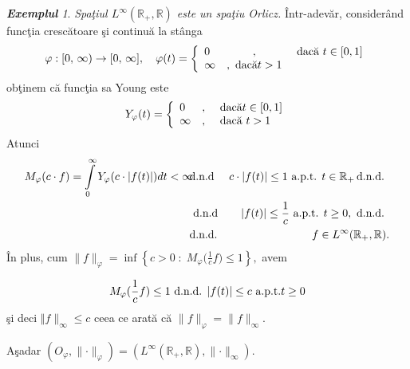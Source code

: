 \documentclass[ a4paper, 12pt]{report}
\theoremstyle{definition}
\theoremstyle{remark}
\newtheorem{exemple}{\bf Exemplul}[section]
\numberwithin{equation}{section}
\begin{document}
\begin{exemple} {\it Spa\c tiul $L^\infty(\mathbb{R}_+, \mathbb{R})$ este un spa\c tiu Orlicz.} \^ Intr-adev\u ar, consider\^ and func\c tia cresc\u atoare \c si continu\u a la st\^ anga
$$\varphi : [0,\, \infty) \rightarrow [0, \, \infty], \quad \varphi(t) = \left\{ \begin{array}{lcl} 0 &,& \hbox { dac\u a } t \in [0,1]\\
\infty &, \hbox{ dac\u a} t>1 \end{array}\right. $$
ob\c tinem c\u a func\c tia sa Young este
$$Y_\varphi(t) = \left\{ \begin{array}{lcl} 0 &,& \hbox{ dac\u a} t \in [0,1]\\
\infty &,& \hbox{ dac\u a } t>1 \end{array} \right. $$
Atunci
\begin{eqnarray*}
M_\varphi(c \cdot f) = \int\limits_{0}^{\infty} Y_\varphi(c \cdot \lvert f(t) \rvert) dt < \infty \!\!&\hbox{d.n.d}& \!\! c \cdot \lvert f(t) \rvert \leq 1 \hbox{ a.p.t. } t \in \mathbb{R}_+ \! \hbox{ d.n.d. }\\
&\hbox{ d.n.d }& \lvert f(t) \rvert \leq \frac{1}{c} \hbox{ a.p.t. } t \geq 0, \hbox{ d.n.d. } \\
&\hbox{d.n.d.}& f \in L^{\infty}(\mathbb{R}_+,\mathbb{R}).
\end{eqnarray*}
\^ In plus, cum $\lVert f \rVert_\varphi = \inf\left\{ c > 0 \; :\; M_\varphi\Big( \frac{1}{c}f \Big) \leq 1\right\},$ avem

$$M_\varphi(\frac{1}{c}f) \leq 1 \hbox{ d.n.d. } \lvert f(t) \rvert \leq c \hbox{ a.p.t.} t \geq 0 $$
\c si deci $\Vert f \rVert_{\infty} \leq c$ ceea ce arat\u a  c\u  a $\lVert f\rVert_\varphi = \lVert f \rVert_{\infty}$.

A\c sadar $ (O_\varphi, \lVert \cdot \rVert_\varphi) = (L^\infty(\mathbb{R}_+, \mathbb{R}),\lVert \cdot \rVert_\infty).$
\end{exemple}

\bigskip
\end{document}
